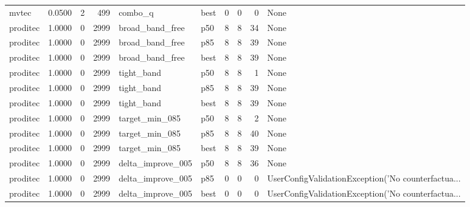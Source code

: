 \begin{tabular}{lrrrllrrrl}
   mvtec &    0.0500 &    2 &    499 &              combo\_q &   best &               0 &          0 &       0 &                                               None \\
proditec &    1.0000 &    0 &   2999 &      broad\_band\_free &    p50 &               8 &          8 &      34 &                                               None \\
proditec &    1.0000 &    0 &   2999 &      broad\_band\_free &    p85 &               8 &          8 &      39 &                                               None \\
proditec &    1.0000 &    0 &   2999 &      broad\_band\_free &   best &               8 &          8 &      39 &                                               None \\
proditec &    1.0000 &    0 &   2999 &           tight\_band &    p50 &               8 &          8 &       1 &                                               None \\
proditec &    1.0000 &    0 &   2999 &           tight\_band &    p85 &               8 &          8 &      39 &                                               None \\
proditec &    1.0000 &    0 &   2999 &           tight\_band &   best &               8 &          8 &      39 &                                               None \\
proditec &    1.0000 &    0 &   2999 &       target\_min\_085 &    p50 &               8 &          8 &       2 &                                               None \\
proditec &    1.0000 &    0 &   2999 &       target\_min\_085 &    p85 &               8 &          8 &      40 &                                               None \\
proditec &    1.0000 &    0 &   2999 &       target\_min\_085 &   best &               8 &          8 &      39 &                                               None \\
proditec &    1.0000 &    0 &   2999 &    delta\_improve\_005 &    p50 &               8 &          8 &      36 &                                               None \\
proditec &    1.0000 &    0 &   2999 &    delta\_improve\_005 &    p85 &               0 &          0 &       0 & UserConfigValidationException('No counterfactua... \\
proditec &    1.0000 &    0 &   2999 &    delta\_improve\_005 &   best &               0 &          0 &       0 & UserConfigValidationException('No counterfactua... \\

\end{tabular}
